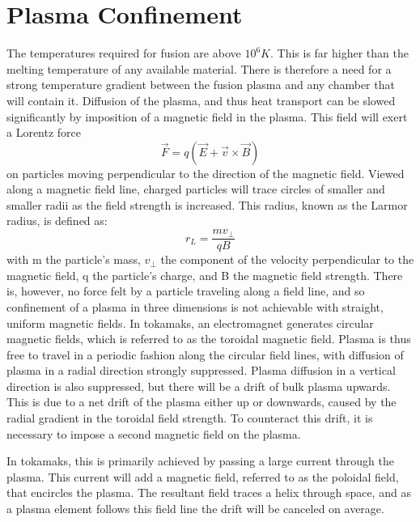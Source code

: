 \section{Plasma Confinement}
The temperatures required for fusion are above $10^6 K$.  This is far higher than the melting temperature of any available material.  There is therefore a need for a strong temperature gradient between the fusion plasma and any chamber that will contain it.  Diffusion of the plasma, and thus heat transport can be slowed significantly by imposition of a magnetic field in the plasma.  This field will exert a Lorentz force 
\begin{equation}
\vec{F} = q(\vec{E} + \vec{v} \times \vec{B}) 
\end{equation}
on particles moving perpendicular to the direction of the magnetic field.  Viewed along a magnetic field line, charged particles will trace circles of smaller and smaller radii as the field strength is increased.  This radius, known as the Larmor radius, is defined as:\begin{equation}
r_L = \frac{mv_\perp}{qB}
\end{equation}
with m the particle's mass, $v_\perp$ the component of the velocity perpendicular to the magnetic field, q the particle's charge, and B the magnetic field strength.
There is, however, no force felt by a particle traveling along a field line, and so confinement of a plasma in three dimensions is not achievable with straight, uniform magnetic fields.  In tokamaks, an electromagnet generates circular magnetic fields, which is referred to as the toroidal magnetic field.  Plasma is thus free to travel in a periodic fashion along the circular field lines, with diffusion of plasma in a radial direction strongly suppressed.  Plasma diffusion in a vertical direction is also suppressed, but there will be a drift of bulk plasma upwards.  This is due to a net drift of the plasma either up or downwards, caused by the radial gradient in the toroidal field strength.  To counteract this drift, it is necessary to impose a second magnetic field on the plasma.\par 
In tokamaks, this is primarily achieved by passing a large current through the plasma.  This current will add a magnetic field, referred to as the poloidal field, that encircles the plasma.  The resultant field traces a helix through space, and as a plasma element follows this field line the drift will be canceled on average.\par

